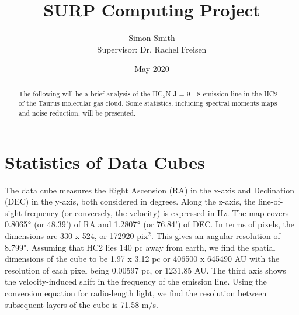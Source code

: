 \documentclass{article}
\title{SURP Computing Project}
\author{Simon Smith \\ Supervisor: Dr. Rachel Freisen}
\date{May 2020}
\begin{document}
\maketitle

\begin{abstract}
    The following will be a brief analysis of the HC$_5$N J = 9 - 8 emission line in the HC2 of the Taurus molecular gas cloud. Some statistics, including spectral moments maps and noise reduction, will be presented.
\end{abstract}

\section{Statistics of Data Cubes}

The data cube measures the Right Ascension (RA) in the x-axis and Declination (DEC) in the y-axis, both considered in degrees. Along the z-axis, the line-of-sight frequency (or conversely, the velocity) is expressed in Hz. The map covers 0.8065$\degree$ (or 48.39') of RA and 1.2807$\degree$ (or 76.84') of DEC. In terms of pixels, the dimensions are 330 x 524, or 172920 pix$^2$. This gives an angular resolution of 8.799". Assuming that HC2 lies 140 pc away from earth, we find the spatial dimensions of the cube to be 1.97 x 3.12 pc or 406500 x 645490 AU with the resolution of each pixel being 0.00597 pc, or 1231.85 AU. The third axis shows the velocity-induced shift in the frequency of the emission line. Using the conversion equation for radio-length light, we find the resolution between subsequent layers of the cube is 71.58 m/s.
\end{document}
